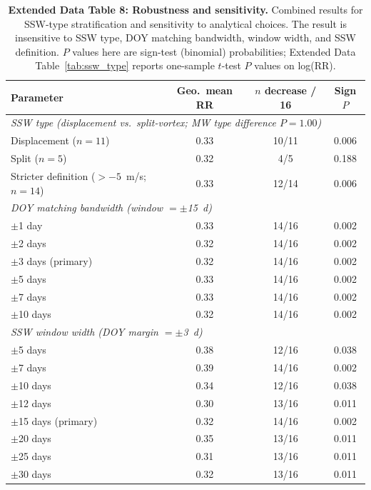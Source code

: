 \documentclass[11pt,letterpaper]{article}
\begin{document}
\begin{table}[!ht]
\centering
\caption{\textbf{Extended Data Table 8: Robustness and sensitivity.}
Combined results for SSW-type stratification and sensitivity to analytical choices. The result is insensitive to SSW type, DOY matching bandwidth, window width, and SSW definition. $P$ values here are sign-test (binomial) probabilities; Extended Data Table~\ref{tab:ssw_type} reports one-sample $t$-test $P$ values on log(RR).}
\label{tab:sensitivity}
\small
\begin{tabular}{lccc}
\toprule
Parameter & Geo.\ mean RR & $n$ decrease / 16 & Sign $P$ \\
\midrule
\multicolumn{4}{l}{\textit{SSW type (displacement vs.\ split-vortex; MW type difference $P = 1.00$)}} \\
Displacement ($n = 11$) & 0.33 & 10/11 & 0.006 \\
Split ($n = 5$) & 0.32 & 4/5 & 0.188 \\
Stricter definition ($> -5$~m/s; $n = 14$) & 0.33 & 12/14 & 0.006 \\
\midrule
\multicolumn{4}{l}{\textit{DOY matching bandwidth (window $= \pm$15~d)}} \\
$\pm$1 day & 0.33 & 14/16 & 0.002 \\
$\pm$2 days & 0.32 & 14/16 & 0.002 \\
$\pm$3 days (primary) & 0.32 & 14/16 & 0.002 \\
$\pm$5 days & 0.33 & 14/16 & 0.002 \\
$\pm$7 days & 0.33 & 14/16 & 0.002 \\
$\pm$10 days & 0.32 & 14/16 & 0.002 \\
\midrule
\multicolumn{4}{l}{\textit{SSW window width (DOY margin $= \pm$3~d)}} \\
$\pm$5 days & 0.38 & 12/16 & 0.038 \\
$\pm$7 days & 0.39 & 14/16 & 0.002 \\
$\pm$10 days & 0.34 & 12/16 & 0.038 \\
$\pm$12 days & 0.30 & 13/16 & 0.011 \\
$\pm$15 days (primary) & 0.32 & 14/16 & 0.002 \\
$\pm$20 days & 0.35 & 13/16 & 0.011 \\
$\pm$25 days & 0.31 & 13/16 & 0.011 \\
$\pm$30 days & 0.32 & 13/16 & 0.011 \\
\bottomrule
\end{tabular}
\end{table}
\end{document}
